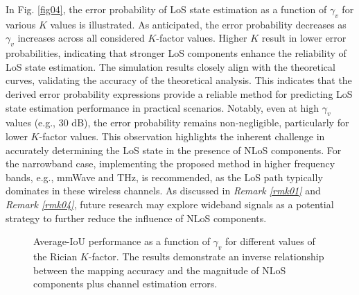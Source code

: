 \documentclass[conference, a4paper]{IEEEtran}
\newcommand{\figref}[1]{Fig. \ref{#1}}
\newcommand{\remref}[1]{{\it Remark \ref{#1}}}
\begin{document}
In \figref{fig04}, the error probability of LoS state estimation as a function of $\gamma_{v}$ for various $K$ values is illustrated.
As anticipated, the error probability decreases as $\gamma_{v}$ increases across all considered $K$-factor values.
Higher $K$ result in lower error probabilities, indicating that stronger LoS components enhance the reliability of LoS state estimation.
The simulation results closely align with the theoretical curves, validating the accuracy of the theoretical analysis.
This indicates that the derived error probability expressions provide a reliable method for predicting LoS state estimation performance in practical scenarios.
Notably, even at high $\gamma_{v}$ values (e.g., $30$ dB), the error probability remains non-negligible, particularly for lower $K$-factor values.
This observation highlights the inherent challenge in accurately determining the LoS state in the presence of NLoS components.
For the narrowband case, implementing the proposed method in higher frequency bands, e.g., mmWave and THz, is recommended, as the LoS path typically dominates in these wireless channels.
As discussed in \remref{rmk01} and \remref{rmk04}, future research may explore wideband signals as a potential strategy to further reduce the influence of NLoS components.

\begin{figure*}[t]
	\centering
	\caption{\label{fig05} Average-IoU performance as a function of $\gamma_{v}$ for different values of the Rician $K$-factor. The results demonstrate an inverse relationship between the mapping accuracy and the magnitude of NLoS components plus channel estimation errors.}
	\vspace{-0.5em}
\end{figure*}
\end{document}
